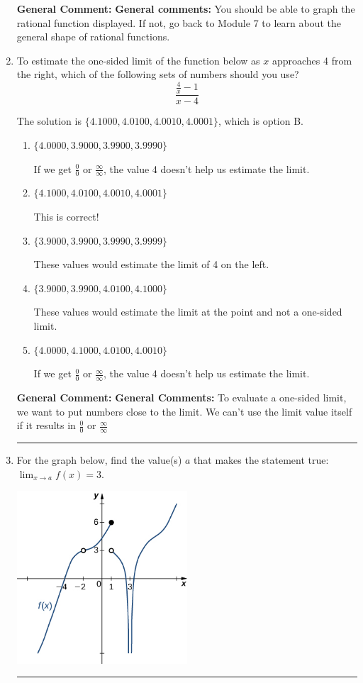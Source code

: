 \documentclass{extbook}[14pt]
\newcommand{\litem}[1]{\item #1

\rule{\textwidth}{0.4pt}}
\begin{document}
\begin{enumerate}
{\begin{enumerate}[label=\Alph*.]
\end{enumerate}

\textbf{General Comment:} \textbf{General comments:} You should be able to graph the rational function displayed. If not, go back to Module 7 to learn about the general shape of rational functions.
}
\litem{
To estimate the one-sided limit of the function below as $x$ approaches 4 from the right, which of the following sets of numbers should you use?
\[ \frac{\frac{4}{x} - 1}{x - 4} \]

The solution is \( \{ 4.1000, 4.0100, 4.0010, 4.0001 \} \), which is option B.\begin{enumerate}[label=\Alph*.]
\item \( \{ 4.0000, 3.9000, 3.9900, 3.9990 \} \)

If we get $\frac{0}{0}$ or $\frac{\infty}{\infty}$, the value 4 doesn't help us estimate the limit.
\item \( \{ 4.1000, 4.0100, 4.0010, 4.0001 \} \)

This is correct!
\item \( \{ 3.9000, 3.9900, 3.9990, 3.9999 \} \)

These values would estimate the limit of 4 on the left.
\item \( \{ 3.9000, 3.9900, 4.0100, 4.1000 \} \)

These values would estimate the limit at the point and not a one-sided limit.
\item \( \{ 4.0000, 4.1000, 4.0100, 4.0010 \} \)

If we get $\frac{0}{0}$ or $\frac{\infty}{\infty}$, the value 4 doesn't help us estimate the limit.
\end{enumerate}

\textbf{General Comment:} \textbf{General Comments:} To evaluate a one-sided limit, we want to put numbers close to the limit. We can't use the limit value itself if it results in $\frac{0}{0}$ or $\frac{\infty}{\infty}$
}
\litem{
For the graph below, find the value(s) $a$ that makes the statement true: $ \displaystyle \lim_{x \rightarrow a} f(x) = 3$.

\begin{center}
    \includegraphics[width=0.5\textwidth]{../Figures/evaluateLimitGraphicallyCopyB.png}
\end{center}




}
\end{enumerate}
\end{document}
